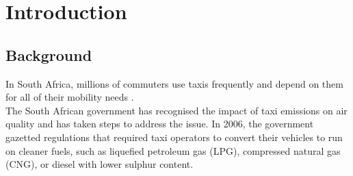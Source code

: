 \graphicspath{{introduction/fig/}}

\chapter{Introduction}
\label{chap:introduction}

\section{Background}
In South Africa, millions of commuters use taxis frequently and depend on them for all of their mobility needs \cite{depttransport2023}.\\
The South African government has recognised the impact of taxi emissions on air quality and has taken steps to address the issue. In 2006, the government gazetted regulations that required taxi operators to convert their vehicles to run on cleaner fuels, such as liquefied petroleum gas (LPG), compressed natural gas (CNG), or diesel with lower sulphur content\cite{2007Comparison}. 

